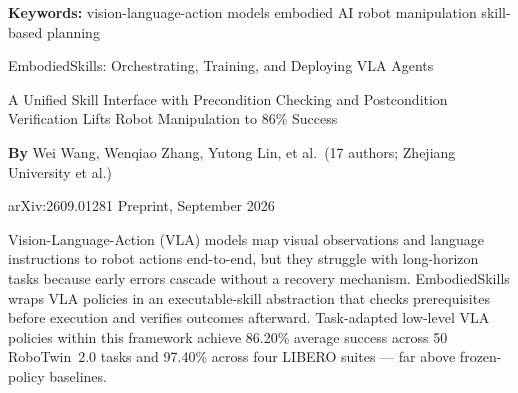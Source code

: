 \documentclass[10pt,twocolumn]{article}
\begin{document}
\setlength{\parindent}{0pt}
\setlength{\parskip}{4pt}

{\small\color{keywordgray}\textbf{Keywords:}
  vision-language-action models \textbullet{}
  embodied AI \textbullet{}
  robot manipulation \textbullet{}
  skill-based planning}\par\vspace{4pt}

{\LARGE\bfseries\raggedright
  EmbodiedSkills: Orchestrating, Training,
  and Deploying VLA Agents}\par\vspace{4pt}

{\large\itshape\raggedright
  A Unified Skill Interface with Precondition
  Checking and Postcondition Verification
  Lifts Robot Manipulation to 86\% Success}\par\vspace{6pt}

{\small\textbf{By} Wei Wang, Wenqiao Zhang, Yutong Lin, et al.\
  (17 authors; Zhejiang University et al.)}\par\vspace{2pt}

{\small\color{keywordgray}arXiv:2609.01281 \textbullet{} Preprint, September 2026}
\par\vspace{2pt}\noindent{\color{rulered}\rule{\columnwidth}{0.6pt}}\vspace{6pt}

Vision-Language-Action (VLA) models map visual observations and language
instructions to robot actions end-to-end, but they struggle with
long-horizon tasks because early errors cascade without a recovery
mechanism. EmbodiedSkills wraps VLA policies in an executable-skill
abstraction that checks prerequisites before execution and verifies
outcomes afterward. Task-adapted low-level VLA policies within this
framework achieve 86.20\% average success across 50 RoboTwin~2.0 tasks
and 97.40\% across four LIBERO suites --- far above frozen-policy baselines.
\end{document}
